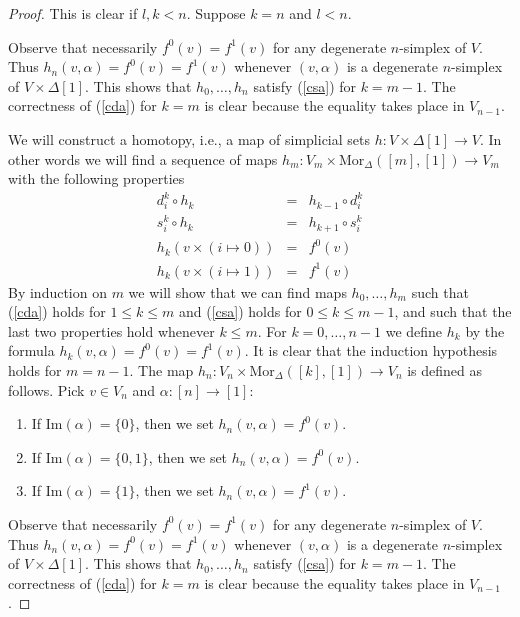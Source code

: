 \begin{proof}
This is clear if $l, k < n$. Suppose $k = n$ and $l < n$.






Observe that necessarily $f^0(v) = f^1(v)$
for any degenerate $n$-simplex of $V$. Thus
$h_n(v, \alpha) = f^0(v) = f^1(v)$ whenever $(v, \alpha)$ is a degenerate
$n$-simplex of $V \times \Delta[1]$. This shows that
$h_0, \ldots, h_n$ satisfy (\ref{csa}) for $k = m - 1$.
The correctness of (\ref{cda}) for $k = m$ is clear because
the equality takes place in $V_{n - 1}$.








\medskip\noindent
We will construct a homotopy, i.e., a map of simplicial sets
$h : V \times \Delta[1] \to V$. In other words we will find
a sequence of maps $h_m : V_m \times \text{Mor}_{\Delta}([m], [1])
\to V_m$ with the following properties
\begin{eqnarray}
d^k_i \circ h_k & = & h_{k - 1} \circ d^k_i \label{cda}\\
s^k_i \circ h_k & = & h_{k + 1} \circ s^k_i \label{csa}\\
h_k( v \times (i \mapsto 0)) & = & f^0(v) \nonumber \\
h_k( v \times (i \mapsto 1)) & = & f^1(v) \nonumber
\end{eqnarray}
By induction on $m$ we will show that we can find maps
$h_0, \ldots, h_m$ such that (\ref{cda}) holds for
$1 \leq k \leq m$ and (\ref{csa}) holds for $0 \leq k \leq m - 1$,
and such that the last two properties hold whenever $k \leq m$.
For $k = 0, \ldots, n - 1$ we define $h_k$ by the
formula $h_k(v, \alpha) = f^0(v) = f^1(v)$.
It is clear that the induction hypothesis holds for
$m = n - 1$. The map $h_n : V_n \times \text{Mor}_{\Delta}([k], [1]) \to V_n$
is defined as follows. Pick $v \in V_n$ and $\alpha : [n] \to [1]$:
\begin{enumerate}
\item If $\text{Im}(\alpha) = \{0\}$, then we set $h_n(v, \alpha) = f^0(v)$.
\item If $\text{Im}(\alpha) = \{0, 1\}$, then we set $h_n(v, \alpha) = f^0(v)$.
\item If $\text{Im}(\alpha) = \{1\}$, then we set $h_n(v, \alpha) = f^1(v)$.
\end{enumerate}
Observe that necessarily $f^0(v) = f^1(v)$
for any degenerate $n$-simplex of $V$. Thus
$h_n(v, \alpha) = f^0(v) = f^1(v)$ whenever $(v, \alpha)$ is a degenerate
$n$-simplex of $V \times \Delta[1]$. This shows that
$h_0, \ldots, h_n$ satisfy (\ref{csa}) for $k = m - 1$.
The correctness of (\ref{cda}) for $k = m$ is clear because
the equality takes place in $V_{n - 1}$.

\medskip\noindent



\end{proof}




